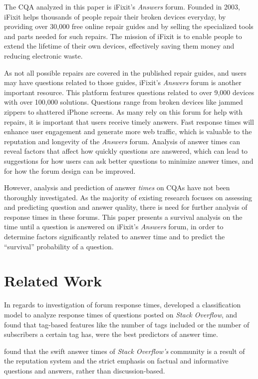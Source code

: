 \documentclass[12pt]{article}
\begin{document}
    The CQA analyzed in this paper is iFixit's \textit{Answers} forum. Founded in 2003, iFixit helps thousands of people repair their broken devices everyday, by providing over 30,000 free online repair guides and by selling the specialized tools and parts needed for such repairs. The mission of iFixit is to enable people to extend the lifetime of their own devices, effectively saving them money and reducing electronic waste. 
    
    As not all possible repairs are covered in the published repair guides, and users may have questions related to those guides, iFixit's \textit{Answers} forum is another important resource. This platform features questions related to over 9,000 devices with over 100,000 solutions. Questions range from broken devices like jammed zippers to shattered iPhone screens. As many rely on this forum for help with repairs, it is important that users receive timely answers. Fast response times will enhance user engagement and generate more web traffic, which is valuable to the reputation and longevity of the \textit{Answers} forum. Analysis of answer times can reveal factors that affect how quickly questions are answered, which can lead to suggestions for how users can ask better questions to minimize answer times, and for how the forum design can be improved. 
    
    However, analysis and prediction of answer \textit{times} on CQAs have not been thoroughly investigated. As the majority of existing research focuses on assessing and predicting question and answer quality, there is need for further analysis of response times in these forums. This paper presents a survival analysis on the time until a question is answered on iFixit's \textit{Answers} forum, in order to determine factors significantly related to answer time and to predict the ``survival'' probability of a question.

\section{Related Work}

    In regards to investigation of forum response times, \citep{Bhat2014} developed a classification model to analyze response times of questions posted on \textit{Stack Overflow}, and found that tag-based features like the number of tags included or the number of subscribers a certain tag has, were the best predictors of answer time. 

    \citep{Mamykina2011} found that the swift answer times of \textit{Stack Overflow's} community is a result of the reputation system and the strict emphasis on factual and informative questions and answers, rather than discussion-based. 
\end{document}
